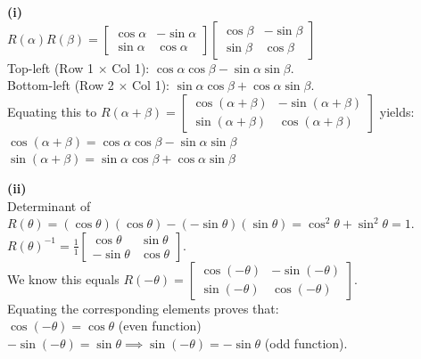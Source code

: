 \begin{solution}
\textbf{(i)} \\
$R(\alpha)R(\beta) = \begin{bmatrix} \cos\alpha & -\sin\alpha \\ \sin\alpha & \cos\alpha \end{bmatrix} \begin{bmatrix} \cos\beta & -\sin\beta \\ \sin\beta & \cos\beta \end{bmatrix}$ \\
Top-left (Row 1 $\times$ Col 1): $\cos\alpha\cos\beta - \sin\alpha\sin\beta$. \\
Bottom-left (Row 2 $\times$ Col 1): $\sin\alpha\cos\beta + \cos\alpha\sin\beta$. \\
Equating this to $R(\alpha+\beta) = \begin{bmatrix} \cos(\alpha+\beta) & -\sin(\alpha+\beta) \\ \sin(\alpha+\beta) & \cos(\alpha+\beta) \end{bmatrix}$ yields: \\
\textbf{$\cos(\alpha+\beta) = \cos\alpha\cos\beta - \sin\alpha\sin\beta$} \\
\textbf{$\sin(\alpha+\beta) = \sin\alpha\cos\beta + \cos\alpha\sin\beta$}

\medskip
\textbf{(ii)} \\
Determinant of $R(\theta) = (\cos\theta)(\cos\theta) - (-\sin\theta)(\sin\theta) = \cos^2\theta + \sin^2\theta = 1$. \\
$R(\theta)^{-1} = \frac{1}{1} \begin{bmatrix} \cos\theta & \sin\theta \\ -\sin\theta & \cos\theta \end{bmatrix}$. \\
We know this equals $R(-\theta) = \begin{bmatrix} \cos(-\theta) & -\sin(-\theta) \\ \sin(-\theta) & \cos(-\theta) \end{bmatrix}$. \\
Equating the corresponding elements proves that: \\
\textbf{$\cos(-\theta) = \cos\theta$} (even function) \\
\textbf{$-\sin(-\theta) = \sin\theta \implies \sin(-\theta) = -\sin\theta$} (odd function).


\end{solution}
